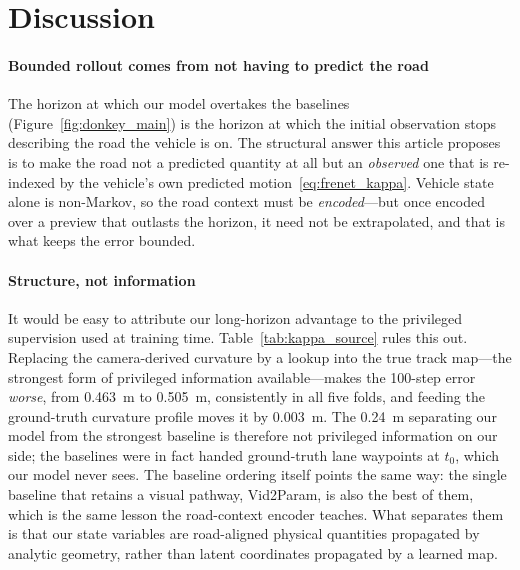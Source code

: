\documentclass[preprint,12pt]{elsarticle}
\begin{document}
\section{Discussion}\label{sec:discussion}

\paragraph{Bounded rollout comes from not having to predict the road}
The horizon at which our model overtakes the baselines
(Figure~\ref{fig:donkey_main}) is the horizon at which the initial observation
stops describing the road the vehicle is on.
The structural answer this article proposes is to make the road not a predicted
quantity at all but an \emph{observed} one that is re-indexed by the vehicle's own
predicted motion~\eqref{eq:frenet_kappa}.
Vehicle state alone is non-Markov, so the road context must be
\emph{encoded}---but once encoded over a preview that outlasts the horizon, it
need not be extrapolated, and that is what keeps the error bounded.

\paragraph{Structure, not information}
It would be easy to attribute our long-horizon advantage to the privileged
supervision used at training time. Table~\ref{tab:kappa_source} rules this out.
Replacing the camera-derived curvature by a lookup into the true track map---the
strongest form of privileged information available---makes the 100-step error
\emph{worse}, from \SI{0.463}{m} to \SI{0.505}{m}, consistently in all five folds,
and feeding the ground-truth curvature profile moves it by \SI{0.003}{m}.
The \SI{0.24}{m} separating our model from the strongest baseline is
therefore not privileged information on our side; the baselines were in fact
handed ground-truth lane waypoints at $t_0$, which our model never sees.
The baseline ordering itself points the same way: the single baseline
that retains a visual pathway, Vid2Param, is also the best of them, which is the
same lesson the road-context encoder teaches.
What separates them is that our state variables are road-aligned physical
quantities propagated by analytic geometry, rather than latent coordinates
propagated by a learned map.
\end{document}
